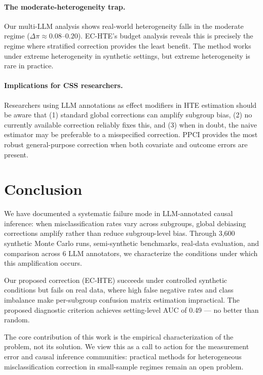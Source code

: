 \documentclass[11pt]{article}
\begin{document}
\paragraph{The moderate-heterogeneity trap.}
Our multi-LLM analysis shows real-world heterogeneity falls in the moderate regime ($\Delta\pi \approx 0.08$--$0.20$).
EC-HTE's budget analysis reveals this is precisely the regime where stratified correction provides the least benefit.
The method works under extreme heterogeneity in synthetic settings, but extreme heterogeneity is rare in practice.

\paragraph{Implications for CSS researchers.}
Researchers using LLM annotations as effect modifiers in HTE estimation should be aware that (1) standard global corrections can amplify subgroup bias, (2) no currently available correction reliably fixes this, and (3) when in doubt, the naive estimator may be preferable to a misspecified correction.
PPCI provides the most robust general-purpose correction when both covariate and outcome errors are present.

\section{Conclusion}

We have documented a systematic failure mode in LLM-annotated causal inference: when misclassification rates vary across subgroups, global debiasing corrections amplify rather than reduce subgroup-level bias.
Through 3{,}600 synthetic Monte Carlo runs, semi-synthetic benchmarks, real-data evaluation, and comparison across 6 LLM annotators, we characterize the conditions under which this amplification occurs.

Our proposed correction (EC-HTE) succeeds under controlled synthetic conditions but fails on real data, where high false negative rates and class imbalance make per-subgroup confusion matrix estimation impractical.
The proposed diagnostic criterion achieves setting-level AUC of 0.49 --- no better than random.

The core contribution of this work is the empirical characterization of the problem, not its solution.
We view this as a call to action for the measurement error and causal inference communities: practical methods for heterogeneous misclassification correction in small-sample regimes remain an open problem.
\end{document}
